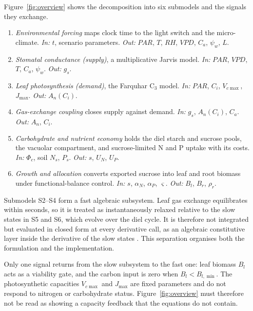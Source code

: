 Figure~\ref{fig:overview} shows the decomposition into six submodels and the
signals they exchange.
\begin{enumerate}\itemsep2pt
\item[\textbf{S1}] \emph{Environmental forcing} maps clock time to the light switch
      and the micro-climate. \emph{In:} $t$, scenario parameters. \emph{Out:}
      $\mathit{PAR}$, $T$, $\mathit{RH}$, $\mathit{VPD}$, $C_a$, $\psi_w$, $L$.
\item[\textbf{S2}] \emph{Stomatal conductance (supply)}, a multiplicative Jarvis
      model. \emph{In:} $\mathit{PAR}$, $\mathit{VPD}$, $T$, $C_a$, $\psi_w$.
      \emph{Out:} $g_s$.
\item[\textbf{S3}] \emph{Leaf photosynthesis (demand)}, the Farquhar C$_3$ model.
      \emph{In:} $\mathit{PAR}$, $C_i$, $V_{c\max}$, $J_{\max}$. \emph{Out:}
      $A_n(C_i)$.
\item[\textbf{S4}] \emph{Gas-exchange coupling} closes supply against demand.
      \emph{In:} $g_s$, $A_n(C_i)$, $C_a$. \emph{Out:} $A_n$, $C_i$.
\item[\textbf{S5}] \emph{Carbohydrate and nutrient economy} holds the diel starch
      and sucrose pools, the vacuolar compartment, and sucrose-limited N and P
      uptake with its costs. \emph{In:} $\Phi_c$, soil $N_s$, $P_s$. \emph{Out:}
      $s$, $U_N$, $U_P$.
\item[\textbf{S6}] \emph{Growth and allocation} converts exported sucrose into
      leaf and root biomass under functional-balance control. \emph{In:} $s$,
      $\alpha_N$, $\alpha_P$, $\varsigma$. \emph{Out:} $B_l$, $B_r$, $\rho_r$.
\end{enumerate}

Submodels S2--S4 form a fast algebraic subsystem. Leaf gas exchange equilibrates
within seconds, so it is treated as instantaneously relaxed relative to the slow
states in S5 and S6, which evolve over the diel cycle. It is therefore not
integrated but evaluated in closed form at every derivative call, as an
algebraic constitutive layer inside the derivative of the slow states
\citep{Cellier1991,Zeigler2000}. This separation organises both the formulation
and the implementation.

Only one signal returns from the slow subsystem to the fast one: leaf biomass
$B_l$ acts as a viability gate, and the carbon input is zero when
$B_l < B_{l,\min}$. The photosynthetic capacities $V_{c\max}$ and $J_{\max}$ are
fixed parameters and do not respond to nitrogen or carbohydrate status.
Figure~\ref{fig:overview} must therefore not be read as showing a capacity
feedback that the equations do not contain.

